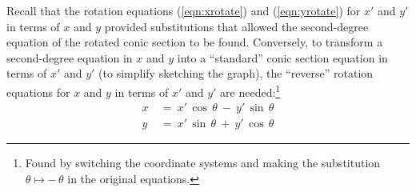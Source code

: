 
Recall that the rotation equations (\ref{eqn:xrotate}) and (\ref{eqn:yrotate})
for $x'$ and $y'$ in terms of $x$ and $y$ provided substitutions that allowed
the second-degree equation of the rotated conic section to be found. Conversely,
to transform a second-degree equation in $x$ and $y$ into a ``standard'' conic
section equation in terms of $x'$ and $y'$ (to simplify sketching the graph),
the ``reverse'' rotation equations for $x$ and $y$ in terms of $x'$ and $y'$ are
needed:\footnote{Found by switching the coordinate systems and making
the substitution $\theta \mapsto -\,\theta$ in the original equations.}
\begin{align}
x ~&=~ x'\,\cos\,\theta ~-~ y'\,\sin\,\theta\label{eqn:xprotate}\\
y ~&=~ x'\,\sin\,\theta ~+~ y'\,\cos\,\theta\label{eqn:yprotate}
\end{align}

